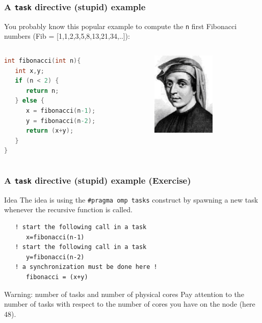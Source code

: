 \begin{frame}[containsverbatim]
\frametitle{A \texttt{task} directive (stupid) example}

You probably know this popular example to compute the \texttt{n} first Fibonacci numbers (Fib = [1,1,2,3,5,8,13,21,34,..]):

\begin{columns}
\begin{column}{7cm}

\begin{lstlisting}[language=C,frame=lines]
int fibonacci(int n){
   int x,y;
   if (n < 2) {
      return n;
   } else {
      x = fibonacci(n-1);
      y = fibonacci(n-2);
      return (x+y);
   }
}
\end{lstlisting}

\end{column}
\begin{column}[c]{3cm}
{\includegraphics[height=4cm]{Day1/images/Fibonacci.jpg}}
\end{column}
\end{columns}

\end{frame}

\begin{frame}[containsverbatim]
\frametitle{A \texttt{task} directive (stupid) example (Exercise)}

\begin{block}{Idea}
The idea is using the {\tt \#pragma omp tasks} construct by spawning a new task whenever the recursive function is called.
\begin{verbatim}
   ! start the following call in a task
      x=fibonacci(n-1)
   ! start the following call in a task
      y=fibonacci(n-2)
   ! a synchronization must be done here !
      fibonacci = (x+y)
\end{verbatim}

\end{block}

\begin{alertblock}{Warning: number of tasks and number of physical cores}
Pay attention to the number of tasks with respect to the number of cores you have on the node (here 48).
\end{alertblock}
\end{frame}



